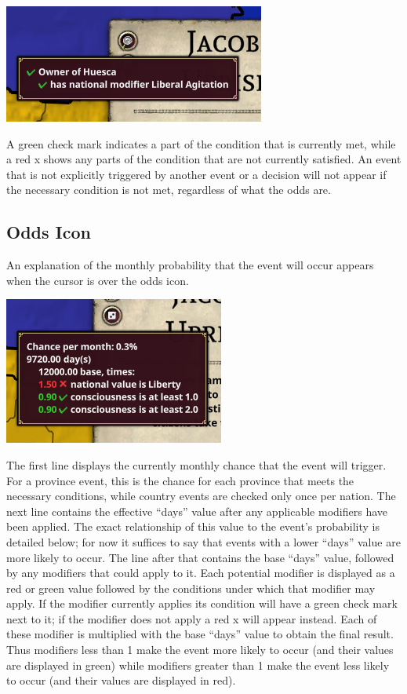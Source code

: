 \begin{center}
	\includegraphics{province_e_trigger.png}
\end{center}

A green check mark indicates a part of the condition that is currently met, while a red x shows any parts of the condition that are not currently satisfied. An event that is not explicitly triggered by another event or a decision will not appear if the necessary condition is not met, regardless of what the odds are.
\subsection{Odds Icon}
An explanation of the monthly probability that the event will occur appears when the cursor is over the odds icon.

\begin{center}
	\includegraphics{province_odds.png}
\end{center}

The first line displays the currently monthly chance that the event will trigger. For a province event, this is the chance for each province that meets the necessary conditions, while country events are checked only once per nation. The next line contains the effective ``days'' value after any applicable modifiers have been applied. The exact relationship of this value to the event's probability is detailed below; for now it suffices to say that events with a lower ``days'' value are more likely to occur. The line after that contains the base ``days'' value, followed by any modifiers that could apply to it. Each potential modifier is displayed as a red or green value followed by the conditions under which that modifier may apply. If the modifier currently applies its condition will have a green check mark next to it; if the modifier does not apply a red x will appear instead. Each of these modifier is multiplied with the base ``days'' value to obtain the final result. Thus modifiers less than 1 make the event more likely to occur (and their values are displayed in green) while modifiers greater than 1 make the event less likely to occur (and their values are displayed in red).
